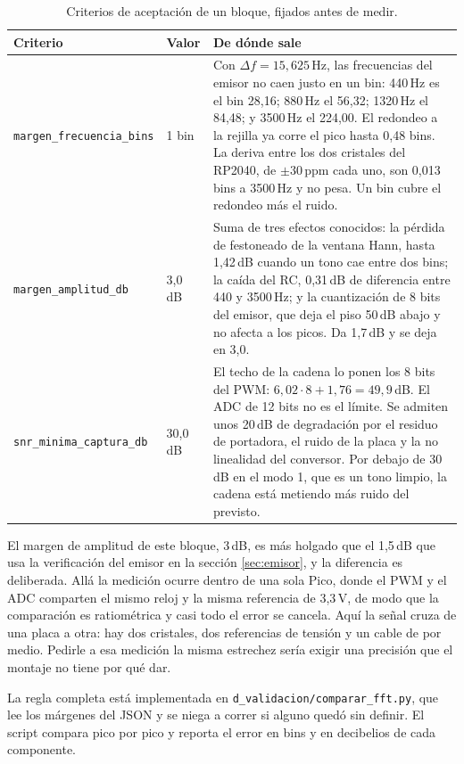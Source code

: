 \begin{table}[H]
\centering\small
\caption{Criterios de aceptación de un bloque, fijados antes de medir.}
\begin{tabular}{llp{8.6cm}}
\toprule
Criterio & Valor & De dónde sale \\
\midrule
\texttt{margen\_frecuencia\_bins} & 1 bin &
Con $\Delta f = 15{,}625$\,Hz, las frecuencias del emisor no caen justo en un bin:
440\,Hz es el bin 28,16; 880\,Hz el 56,32; 1320\,Hz el 84,48; y 3500\,Hz el 224,00.
El redondeo a la rejilla ya corre el pico hasta 0,48 bins. La deriva entre los dos
cristales del RP2040, de $\pm30$\,ppm cada uno, son 0,013 bins a 3500\,Hz y no
pesa. Un bin cubre el redondeo más el ruido. \\
\addlinespace
\texttt{margen\_amplitud\_db} & 3,0 dB &
Suma de tres efectos conocidos: la pérdida de festoneado de la ventana Hann, hasta
1,42\,dB cuando un tono cae entre dos bins; la caída del RC, 0,31\,dB de diferencia
entre 440 y 3500\,Hz; y la cuantización de 8 bits del emisor, que deja el piso
50\,dB abajo y no afecta a los picos. Da 1,7\,dB y se deja en 3,0. \\
\addlinespace
\texttt{snr\_minima\_captura\_db} & 30,0 dB &
El techo de la cadena lo ponen los 8 bits del PWM:
$6{,}02\cdot 8 + 1{,}76 = 49{,}9$\,dB. El ADC de 12 bits no es el límite. Se
admiten unos 20\,dB de degradación por el residuo de portadora, el ruido de la
placa y la no linealidad del conversor. Por debajo de 30\,dB en el modo 1, que es
un tono limpio, la cadena está metiendo más ruido del previsto. \\
\bottomrule
\end{tabular}
\end{table}

El margen de amplitud de este bloque, 3\,dB, es más holgado que el 1,5\,dB que usa
la verificación del emisor en la sección \ref{sec:emisor}, y la diferencia es
deliberada. Allá la medición ocurre dentro de una sola Pico, donde el PWM y el ADC
comparten el mismo reloj y la misma referencia de 3,3\,V, de modo que la
comparación es ratiométrica y casi todo el error se cancela. Aquí la señal cruza
de una placa a otra: hay dos cristales, dos referencias de tensión y un cable de
por medio. Pedirle a esa medición la misma estrechez sería exigir una precisión
que el montaje no tiene por qué dar.

La regla completa está implementada en
\texttt{d\_validacion/comparar\_fft.py}, que lee los márgenes del JSON y se niega a
correr si alguno quedó sin definir. El script compara pico por pico y reporta el
error en bins y en decibelios de cada componente.

